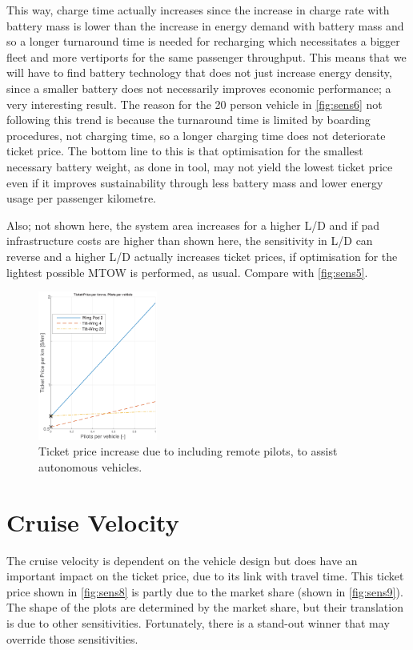 This way, charge time actually increases since the increase in charge rate with battery mass is lower than the increase in energy demand with battery mass and so a longer turnaround time is needed for recharging which necessitates a bigger fleet and more vertiports for the same passenger throughput. This means that we will have to find battery technology that does not just increase energy density, since a smaller battery does not necessarily improves economic performance; a very interesting result. The reason for the 20 person vehicle in \autoref{fig:sens6} not following this trend is because the turnaround time is limited by boarding procedures, not charging time, so a longer charging time does not deteriorate ticket price. The bottom line to this is that optimisation for the smallest necessary battery weight, as done in tool, may not yield the lowest ticket price even if it improves sustainability through less battery mass and lower energy usage per passenger kilometre.

Also; not shown here, the system area increases for a higher L/D and if pad infrastructure costs are higher than shown here, the sensitivity in L/D can reverse and a higher L/D actually increases ticket prices, if optimisation for the lightest possible MTOW is performed, as usual. Compare with \autoref{fig:sens5}.


\begin{figure}
    \centering
    \includegraphics[width=0.35\textwidth]{Figures/autonomous_TPrice_perkm.png}
    \captionsetup{justification=centering}
    \caption{Ticket price increase due to including remote pilots, to assist autonomous vehicles.}
    \label{fig:autocost}
\end{figure}

\section{Cruise Velocity}
The cruise velocity is dependent on the vehicle design but does have an important impact on the ticket price, due to its link with travel time. This ticket price shown in \autoref{fig:sens8} is partly due to the market share (shown in \autoref{fig:sens9}). The shape of the plots are determined by the market share, but their translation is due to other sensitivities. Fortunately, there is a stand-out winner that may override those sensitivities.

